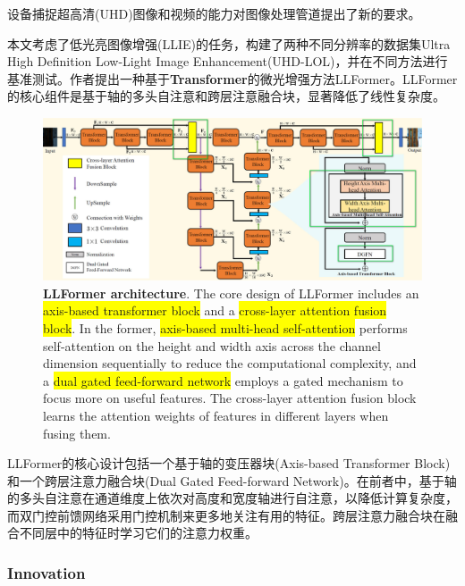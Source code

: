 \documentclass[letterpaper,10pt]{article}
\begin{document}
	设备捕捉超高清(UHD)图像和视频的能力对图像处理管道提出了新的要求。
	
	本文考虑了低光亮图像增强(LLIE)的任务，构建了两种不同分辨率的数据集Ultra High Definition Low-Light Image Enhancement(UHD-LOL)，并在不同方法进行基准测试。作者提出一种基于\textbf{Transformer}的微光增强方法LLFormer。LLFormer的核心组件是基于轴的多头自注意和跨层注意融合块，显著降低了线性复杂度。
	
	\begin{figure}[htbp]
		\centering 
		\includegraphics[width=\columnwidth]{picture/LLFormer_architecture}
		\captionsetup{font=scriptsize}
		\caption{
			\label{fig: LLFormer architecture} %
			\textbf{LLFormer architecture}. The core design of LLFormer includes an \colorbox{yellow}{axis-based transformer block} and a \colorbox{yellow}{cross-layer attention fusion block}. In the former, \colorbox{yellow}{axis-based multi-head self-attention} performs self-attention on the height and width axis across the channel dimension sequentially to reduce the computational complexity, and a \colorbox{yellow}{dual gated feed-forward network} employs a gated mechanism to focus more on useful features. The cross-layer attention fusion block learns the attention weights of features in different layers when fusing them.
			}
	\end{figure}
	LLFormer的核心设计包括一个基于轴的变压器块(Axis-based Transformer Block)和一个跨层注意力融合块(Dual Gated Feed-forward Network)。在前者中，基于轴的多头自注意在通道维度上依次对高度和宽度轴进行自注意，以降低计算复杂度，而双门控前馈网络采用门控机制来更多地关注有用的特征。跨层注意力融合块在融合不同层中的特征时学习它们的注意力权重。
	
	\subsubsection{Innovation}
	
\end{document}
